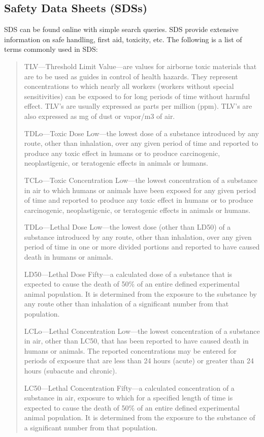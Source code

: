 \documentclass[letterpaper,10pt,english]{sphinxmanual}
\begin{document}
\subsection{Safety Data Sheets (SDSs)}
\label{\detokenize{Laboratory_Safety/Laboratory_Safety:safety-data-sheets-sdss}}
SDS can be found online with simple search queries.  SDS provide extensive information on safe handling, first aid, toxicity, etc. The following is a list of terms commonly used in SDS:
\begin{quote}

TLV—Threshold Limit Value—are values for airborne toxic materials that are to be used as guides in control of health hazards. They represent concentrations to which nearly all workers (workers without special sensitivities) can be exposed to for long periods of time without harmful effect. TLV’s are usually expressed as parts per million (ppm). TLV’s are also expressed as mg of dust or vapor/m3 of air.

TDLo—Toxic Dose Low—the lowest dose of a substance introduced by any route, other than inhalation, over any given period of time and reported to produce any toxic effect in humans or to produce carcinogenic, neoplastigenic, or teratogenic effects in animals or humans.

TCLo—Toxic Concentration Low—the lowest concentration of a substance in air to which humans or animals have been exposed for any given period of time and reported to produce any toxic effect in humans or to produce carcinogenic, neoplastigenic, or teratogenic effects in animals or humans.

TDLo—Lethal Dose Low—the lowest dose (other than LD50) of a substance introduced by any route, other than inhalation, over any given period of time in one or more divided portions and reported to have caused death in humans or animals.

LD50—Lethal Dose Fifty—a calculated dose of a substance that is expected to cause the death of 50\% of an entire defined experimental animal population. It is determined from the exposure to the substance by any route other than inhalation of a significant number from that population.

LCLo—Lethal Concentration Low—the lowest concentration of a substance in air, other than LC50, that has been reported to have caused death in humans or animals. The reported concentrations may be entered for periods of exposure that are less than 24 hours (acute) or greater than 24 hours (subacute and chronic).

LC50—Lethal Concentration Fifty—a calculated concentration of a substance in air, exposure to which for a specified length of time is expected to cause the death of 50\% of an entire defined experimental animal population. It is determined from the exposure to the substance of a significant number from that population.
\end{quote}
\end{document}
